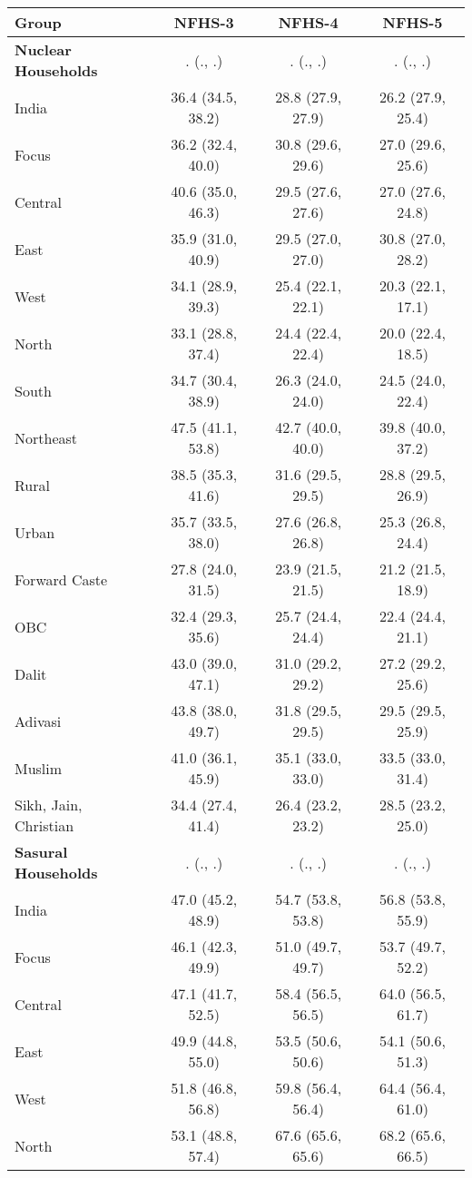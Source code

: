 \begin{tabular}{lccc}
\toprule
Group & NFHS-3 & NFHS-4 & NFHS-5 \\
\midrule
\textbf{Nuclear Households}&. (., .)&. (., .)&. (., .)\\
India&36.4 (34.5, 38.2)&28.8 (27.9, 27.9)&26.2 (27.9, 25.4)\\
Focus&36.2 (32.4, 40.0)&30.8 (29.6, 29.6)&27.0 (29.6, 25.6)\\
Central&40.6 (35.0, 46.3)&29.5 (27.6, 27.6)&27.0 (27.6, 24.8)\\
East&35.9 (31.0, 40.9)&29.5 (27.0, 27.0)&30.8 (27.0, 28.2)\\
West&34.1 (28.9, 39.3)&25.4 (22.1, 22.1)&20.3 (22.1, 17.1)\\
North&33.1 (28.8, 37.4)&24.4 (22.4, 22.4)&20.0 (22.4, 18.5)\\
South&34.7 (30.4, 38.9)&26.3 (24.0, 24.0)&24.5 (24.0, 22.4)\\
Northeast&47.5 (41.1, 53.8)&42.7 (40.0, 40.0)&39.8 (40.0, 37.2)\\
Rural&38.5 (35.3, 41.6)&31.6 (29.5, 29.5)&28.8 (29.5, 26.9)\\
Urban&35.7 (33.5, 38.0)&27.6 (26.8, 26.8)&25.3 (26.8, 24.4)\\
Forward Caste&27.8 (24.0, 31.5)&23.9 (21.5, 21.5)&21.2 (21.5, 18.9)\\
OBC&32.4 (29.3, 35.6)&25.7 (24.4, 24.4)&22.4 (24.4, 21.1)\\
Dalit&43.0 (39.0, 47.1)&31.0 (29.2, 29.2)&27.2 (29.2, 25.6)\\
Adivasi&43.8 (38.0, 49.7)&31.8 (29.5, 29.5)&29.5 (29.5, 25.9)\\
Muslim&41.0 (36.1, 45.9)&35.1 (33.0, 33.0)&33.5 (33.0, 31.4)\\
Sikh, Jain, Christian&34.4 (27.4, 41.4)&26.4 (23.2, 23.2)&28.5 (23.2, 25.0)\\
\textbf{Sasural Households}&. (., .)&. (., .)&. (., .)\\
India&47.0 (45.2, 48.9)&54.7 (53.8, 53.8)&56.8 (53.8, 55.9)\\
Focus&46.1 (42.3, 49.9)&51.0 (49.7, 49.7)&53.7 (49.7, 52.2)\\
Central&47.1 (41.7, 52.5)&58.4 (56.5, 56.5)&64.0 (56.5, 61.7)\\
East&49.9 (44.8, 55.0)&53.5 (50.6, 50.6)&54.1 (50.6, 51.3)\\
West&51.8 (46.8, 56.8)&59.8 (56.4, 56.4)&64.4 (56.4, 61.0)\\
North&53.1 (48.8, 57.4)&67.6 (65.6, 65.6)&68.2 (65.6, 66.5)\\

\end{tabular}
